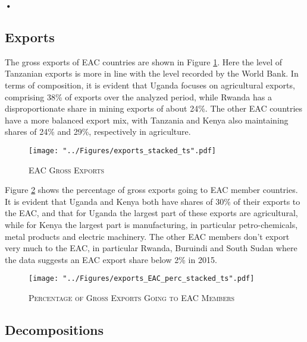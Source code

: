 \textbf{\textbf{•}}\documentclass[a4paper]{article}
\begin{document}
\subsection{Exports}

The gross exports of EAC countries are shown in Figure \ref{fig:exp}. Here the level of Tanzanian exports is more in line with the level recorded by the World Bank. In terms of composition, it is evident that Uganda focuses on agricultural exports, comprising 38\% of exports over the analyzed period, while Rwanda has a disproportionate share in mining exports of about 24\%. The other EAC countries have a more balanced export mix, with Tanzania and Kenya also maintaining shares of 24\% and 29\%, respectively in agriculture. 


\begin{figure}[h!]
\centering
\caption{\label{fig:exp}\textsc{EAC Gross Exports}}
\texttt{[image: "../Figures/exports\_stacked\_ts".pdf]} %
\end{figure}
\FloatBarrier

Figure \ref{fig:exp_EAC_share} shows the percentage of gross exports going to EAC member countries. It is evident that Uganda and Kenya both have shares of 30\% of their exports to the EAC, and that for Uganda the largest part of these exports are agricultural, while for Kenya the largest part is manufacturing, in particular petro-chemicals, metal products and electric machinery.  The other EAC members don't export very much to the EAC, in particular Rwanda, Buruindi and South Sudan where the data suggests an EAC export share below 2\% in 2015. 

\begin{figure}[h!]
\centering
\caption{\label{fig:exp_EAC_share}\textsc{Percentage of Gross Exports Going to EAC Members}}
\texttt{[image: "../Figures/exports\_EAC\_perc\_stacked\_ts".pdf]} %
\end{figure}
\FloatBarrier

\subsection{Decompositions}



\end{document}
